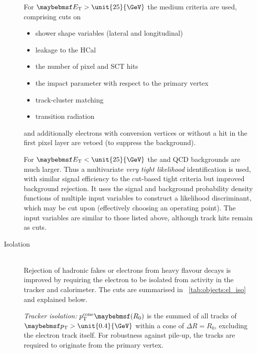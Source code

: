 \begin{description}
	For $\et > \unit{25}{\GeV}$ the medium criteria are used, comprising cuts on
	\begin{itemize}[noitemsep,nolistsep]
		\item shower shape variables (lateral and longitudinal)
		\item leakage to the \ac{HCal}
		\item the number of pixel and \acs{SCT} hits
		\item the impact parameter with respect to the primary vertex
		\item track-cluster matching
		\item transition radiation
	\end{itemize}
	and additionally electrons with conversion vertices or without a hit in the first 
	pixel layer are vetoed (to suppress the \Wgamma background).
 
 	For $\et < \unit{25}{\GeV}$ the \Wjets and QCD backgrounds are much larger. Thus a 
 	multivariate \textit{very tight likelihood} identification is used, with similar 
 	signal efficiency to the cut-based tight criteria but improved background rejection. 
 	It uses the signal and background probability density functions of multiple input 
 	variables to construct a likelihood discriminant, which may be cut upon (effectively 
 	choosing an operating point). The input variables are similar to those listed above, 
 	although track hits remain as cuts.
\item[Isolation] \hfill \\
	Rejection of hadronic fakes or electrons from heavy flavour decays is improved by 
	requiring the electron to be isolated from activity in the tracker and calorimeter. 
	The cuts are summarised in \Table~\ref{tab:objects:el_iso} and explained below.

	\textit{Tracker isolation:} $p_{\text{T}}^{\text{cone}}\parenths{R_0}$ is the summed 
	\pt of all tracks of $\pt > \unit{0.4}{\GeV}$ within a cone of $\Delta R = R_0$, 
	excluding the electron track itself. For robustness against pile-up, the tracks are 
	required to originate from the primary vertex.


\end{description}
